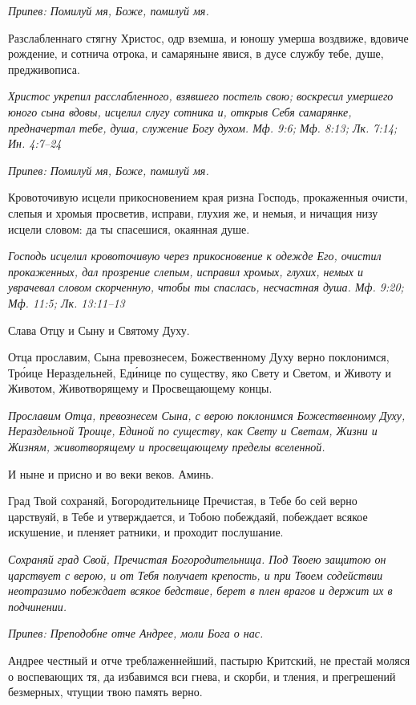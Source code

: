 \itshape Припев:\normalfont{} Помилуй мя, Боже, помилуй мя.


Разслабленнаго стягну Христос, одр вземша, и юношу умерша воздвиже, вдовиче рождение, и сотнича отрока, и самаряныне явися, в дусе службу тебе, душе, предживописа.


\itshape Христос укрепил расслабленного, взявшего постель свою; воскресил умершего юного сына вдовы, исцелил слугу сотника и, открыв Себя самарянке, предначертал тебе, душа, служение Богу духом. Мф. 9:6; Мф. 8:13; Лк. 7:14; Ин. 4:7–24\normalfont{}


\itshape Припев:\normalfont{} Помилуй мя, Боже, помилуй мя.


Кровоточивую исцели прикосновением края ризна Господь, прокаженныя очисти, слепыя и хромыя просветив, исправи, глухия же, и немыя, и ничащия низу исцели словом: да ты спасешися, окаянная душе.


\itshape Господь исцелил кровоточивую через прикосновение к одежде Его, очистил прокаженных, дал прозрение слепым, исправил хромых, глухих, немых и уврачевал словом скорченную, чтобы ты спаслась, несчастная душа. Мф. 9:20; Мф. 11:5; Лк. 13:11–13\normalfont{}


Слава Отцу и Сыну и Святому Духу.


Отца прославим, Сына превознесем, Божественному Духу верно поклонимся, Тро́ице Нераздельней, Еди́нице по существу, яко Свету и Светом, и Животу и Животом, Животворящему и Просвещающему концы.


\itshape Прославим Отца, превознесем Сына, с верою поклонимся Божественному Духу, Нераздельной Троице, Единой по существу, как Свету и Светам, Жизни и Жизням, животворящему и просвещающему пределы вселенной.\normalfont{}


И ныне и присно и во веки веков. Аминь.


Град Твой сохраняй, Богородительнице Пречистая, в Тебе бо сей верно царствуяй, в Тебе и утверждается, и Тобою побеждаяй, побеждает всякое искушение, и пленяет ратники, и проходит послушание.


\itshape Сохраняй град Свой, Пречистая Богородительница. Под Твоею защитою он царствует с верою, и от Тебя получает крепость, и при Твоем содействии неотразимо побеждает всякое бедствие, берет в плен врагов и держит их в подчинении.\normalfont{}


\itshape Припев:\normalfont{} Преподобне отче Андрее, моли Бога о нас.


Андрее честный и отче треблаженнейший, пастырю Критский, не престай моляся о воспевающих тя, да избавимся вси гнева, и скорби, и тления, и прегрешений безмерных, чтущии твою память верно.



